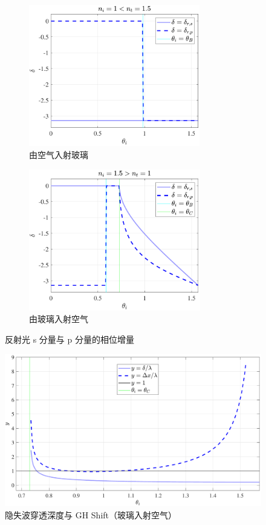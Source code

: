 \documentclass[UTF8]{report}
\theoremstyle{MyLineTheoremStyle} %
\theoremstyle{MyBlockTheoremStyle} %
\theoremstyle{MySubsubsectionStyle} %
\begin{document}
\begin{figure}[H]\centering
\begin{subfigure}[t]{0.5\columnwidth}\centering
    \includegraphics[height=175pt]{assets/1,2/光疏到光密.pdf}
    \caption{ 由空气入射玻璃 }
\end{subfigure}\begin{subfigure}[t]{0.5\columnwidth}\centering
    \includegraphics[height=175pt]{assets/1,2/光密到光疏.pdf}
    \caption{ 由玻璃入射空气 }
\end{subfigure}
\caption{ 反射光 s 分量与 p 分量的相位增量 }
\label{反射光 s 分量与 p 分量的相位增量}
\end{figure}

\begin{figure}[H]\centering
\includegraphics[width=0.70\columnwidth]{assets/1,2/2024-09-21_13-29-49.pdf}
\caption{ 隐失波穿透深度与 GH Shift（玻璃入射空气）}\label{隐失波穿透深度与 GH Shift 玻璃入射空气}
\end{figure}
\end{document}
